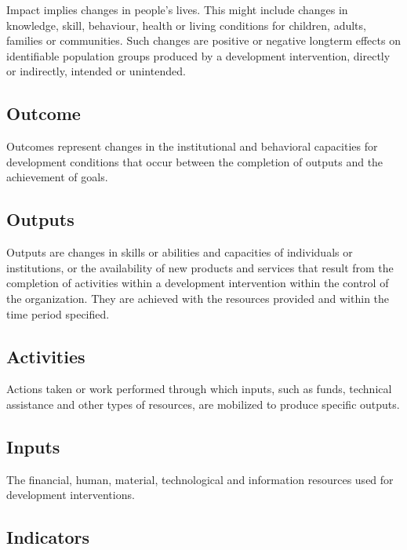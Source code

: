\documentclass[
  a4paper,
  onecolumn,
  oneside]{book}
\begin{document}
Impact implies changes in people's lives. This might include changes in
knowledge, skill, behaviour, health or living conditions for children,
adults, families or communities. Such changes are positive or negative
longterm effects on identifiable population groups produced by a
development intervention, directly or indirectly, intended or
unintended.

\hypertarget{outcome}{%
\subsection{Outcome}\label{outcome}}

Outcomes represent changes in the institutional and behavioral
capacities for development conditions that occur between the completion
of outputs and the achievement of goals.

\hypertarget{outputs}{%
\subsection{Outputs}\label{outputs}}

Outputs are changes in skills or abilities and capacities of individuals
or institutions, or the availability of new products and services that
result from the completion of activities within a development
intervention within the control of the organization. They are achieved
with the resources provided and within the time period specified.

\hypertarget{activities}{%
\subsection{Activities}\label{activities}}

Actions taken or work performed through which inputs, such as funds,
technical assistance and other types of resources, are mobilized to
produce specific outputs.

\hypertarget{inputs}{%
\subsection{Inputs}\label{inputs}}

The financial, human, material, technological and information resources
used for development interventions.

\hypertarget{indicators}{%
\subsection{Indicators}\label{indicators}}
\end{document}
